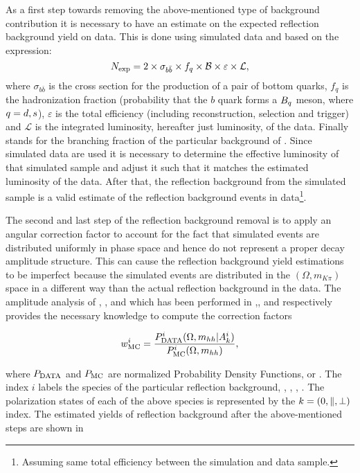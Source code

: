 As a first step towards removing the above-mentioned type of background contribution it is necessary to have an estimate
on the expected reflection background yield on data. This is done using simulated data and based on the expression:
\begin{equation}
N_{\rm exp} = 2 \times \sigma_{b\bar{b}}\times f_q \times {\ensuremath{\cal B}} \times \varepsilon \times {\mathcal{L}},
\end{equation}
\noindent where $\sigma_{b\bar{b}}$ is the cross section for the production of a pair of bottom quarks, $f_q$ is the hadronization fraction
(probability that the $b$ quark forms a $B_q$ meson, where $q=d,s$), $\varepsilon$ is the total efficiency (including reconstruction,
selection and trigger) and ${\mathcal{L}}$ is the integrated luminosity, hereafter just luminosity, of the data. Finally \BF stands for the
branching fraction of the particular background of . Since simulated data are used it is necessary to determine
the effective luminosity of that simulated sample and adjust it such that it matches the estimated luminosity of the data.
After that, the reflection background from the simulated sample is a valid estimate of the reflection background events
in data\footnote{Assuming same total efficiency between the simulation and data sample.}.

The second and last step of the reflection background removal is to apply an angular correction factor to account for the fact that
simulated events are distributed uniformly in phase space and hence do not represent a proper decay amplitude structure.
This can cause the reflection background yield estimations to be imperfect because the simulated events are distributed in the $(\Omega, m_{K\pi})$ space
in a different way than the actual reflection background in the data. The amplitude analysis of \BdJpsipipi, \BsJpsipipi, \BsJpsiKK and \LbJpsipK
which has been performed in \cite{SheldonBdpipi},\cite{SheldonBspipi},\cite{SheldonKK} and \cite{Gao:1701984} respectively provides
the necessary knowledge to compute the correction factors

\begin{equation}
\centering
w_{\rm MC}^i = \frac{P_{\rm DATA}^i (\Omega, m_{hh}  | A_k^i)} {P_{\rm MC}^i(\Omega, m_{hh})},
\end{equation}

\noindent where $P_{\rm DATA}$ and $P_{\rm MC}$ are normalized Probability Density Functions, or \pdfs.
The index $i$ labels the species of the particular reflection background, \ie \BdJpsipipi, \BsJpsipipi, \BsJpsiKK, \LbJpsipK.
The polarization states of each of the above species is represented by the $k=\left( 0, \parallel, \perp \right)$ index.
The estimated yields of reflection background after the above-mentioned steps are shown in 

